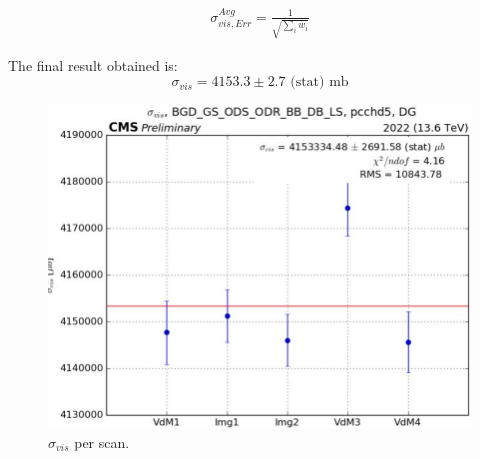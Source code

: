 \begin{eqnarray}
\sigma_{vis,Err}^{Avg}=\frac{1}{\sqrt{ \displaystyle\sum_{i} w_{i}}} 
\label{error}
\end{eqnarray}

The final result obtained is:
\begin{equation}
\sigma_{vis}=4153.3 \pm 2.7 \text{ (stat)  mb}
\end{equation}

\begin{center}
  \begin{figure}[ht]
    \centering
    \includegraphics[scale=0.40]{Chapter4/xsec_perscan_v2.png}
    \caption[$\sigma_{vis}$ average per scan and final result]{ $\sigma_{vis}$  per scan.} 
    \label{sigmavis_perscan}
  \end{figure}
\end{center}


